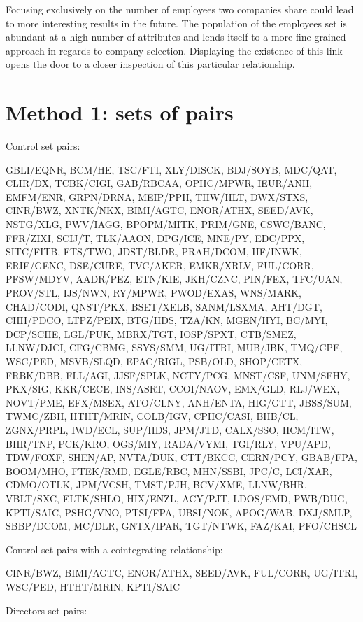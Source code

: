 \documentclass{UoYCSproject}
\begin{document}
Focusing exclusively on the number of employees two companies share could lead to more interesting results in the future. The population of the employees set is abundant at a high number of attributes and lends itself to a more fine-grained approach in regards to company selection. Displaying the existence of this link opens the door to a closer inspection of this particular relationship.

\appendix
\chapter{Method 1: sets of pairs}

{\setlength{\parindent}{0cm}
Control set pairs:

GBLI/EQNR, BCM/HE, TSC/FTI, XLY/DISCK, BDJ/SOYB, MDC/QAT, CLIR/DX, TCBK/CIGI, GAB/RBCAA, OPHC/MPWR, IEUR/ANH, EMFM/ENR, GRPN/DRNA, MEIP/PPH, THW/HLT, DWX/STXS, CINR/BWZ, XNTK/NKX, BIMI/AGTC, ENOR/ATHX, SEED/AVK, NSTG/XLG, PWV/IAGG, BPOPM/MITK, PRIM/GNE, CSWC/BANC, FFR/ZIXI, SCIJ/T, TLK/AAON, DPG/ICE, MNE/PY, EDC/PPX, SITC/FITB, FTS/TWO, JDST/BLDR, PRAH/DCOM, IIF/INWK, ERIE/GENC, DSE/CURE, TVC/AKER, EMKR/XRLV, FUL/CORR, PFSW/MDYV, AADR/PEZ, ETN/KIE, JKH/CZNC, PIN/FEX, TFC/UAN, PROV/STL, IJS/NWN, RY/MPWR, PWOD/EXAS, WNS/MARK, CHAD/CODI, QNST/PKX, BSET/XELB, SANM/LSXMA, AHT/DGT, CHII/PDCO, LTPZ/PEIX, BTG/HDS, TZA/KN, MGEN/HYI, BC/MYI, DCP/SCHE, LGL/PUK, MBRX/TGT, IOSP/SPXT, CTB/SMEZ, LLNW/DJCI, CFG/CBMG, SSYS/SMM, UG/ITRI, MUB/JBK, TMQ/CPE, WSC/PED, MSVB/SLQD, EPAC/RIGL, PSB/OLD, SHOP/CETX, FRBK/DBB, FLL/AGI, JJSF/SPLK, NCTY/PCG, MNST/CSF, UNM/SFHY, PKX/SIG, KKR/CECE, INS/ASRT, CCOI/NAOV, EMX/GLD, RLJ/WEX, NOVT/PME, EFX/MSEX, ATO/CLNY, ANH/ENTA, HIG/GTT, JBSS/SUM, TWMC/ZBH, HTHT/MRIN, COLB/IGV, CPHC/CASI, BHB/CL, ZGNX/PRPL, IWD/ECL, SUP/HDS, JPM/JTD, CALX/SSO, HCM/ITW, BHR/TNP, PCK/KRO, OGS/MIY, RADA/VYMI, TGI/RLY, VPU/APD, TDW/FOXF, SHEN/AP, NVTA/DUK, CTT/BKCC, CERN/PCY, GBAB/FPA, BOOM/MHO, FTEK/RMD, EGLE/RBC, MHN/SSBI, JPC/C, LCI/XAR, CDMO/OTLK, JPM/VCSH, TMST/PJH, BCV/XME, LLNW/BHR, VBLT/SXC, ELTK/SHLO, HIX/ENZL, ACY/PJT, LDOS/EMD, PWB/DUG, KPTI/SAIC, PSHG/VNO, PTSI/FPA, UBSI/NOK, APOG/WAB, DXJ/SMLP, SBBP/DCOM, MC/DLR, GNTX/IPAR, TGT/NTWK, FAZ/KAI, PFO/CHSCL

Control set pairs with a cointegrating relationship:

CINR/BWZ, BIMI/AGTC, ENOR/ATHX, SEED/AVK, FUL/CORR, UG/ITRI, WSC/PED, HTHT/MRIN, KPTI/SAIC

Directors set pairs:

}
\end{document}
